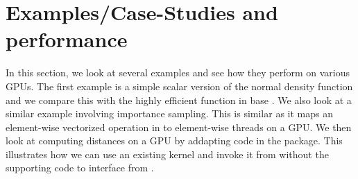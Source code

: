 \section{Examples/Case-Studies and performance}\label{sec:examples}
% 
In this section, we look at several examples and see how they perform
on various GPUs.  The first example is a simple scalar version of the
normal density function and we compare this with the highly efficient
 function in base \R.  We also look at a similar example
involving importance sampling.  This is similar as it maps an
element-wise vectorized operation in \R{} to element-wise threads on a
GPU.  We then look at computing distances on a GPU by addapting code
in the  package.  This illustrates how we can use an
existing kernel and invoke it from \R{} without the supporting \C{}
code to interface from \R.






